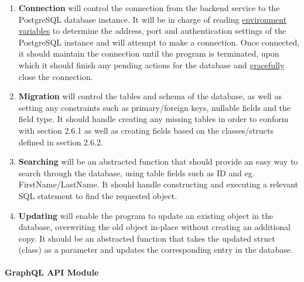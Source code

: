 \documentclass[../../main.tex]{subfiles}
\begin{document}
\begin{enumerate}
    \item \textbf{Connection} will control the connection from the
          backend service to the PostgreSQL database instance. It will be in charge
          of reading \underline{environment variables} to determine
          the address, port and authentication settings of the PostgreSQL
          instance and will attempt to make a connection. Once connected,
          it should maintain the connection until the program is terminated,
          upon which it should finish any pending actions for the database
          and \underline{gracefully} close the connection.

    \item \textbf{Migration} will control the tables and schema of the
          database, as well as setting any constraints such as
          primary/foreign keys, nullable fields and the field type.
          It should handle creating any missing tables in order to conform
          with section 2.6.1 as well as creating fields based on the
          classes/structs defined in section 2.6.2.

    \item \textbf{Searching} will be an abstracted function that should
          provide an easy way to search through the database, using table fields
          such as ID and eg. FirstName/LastName. It should handle constructing
          and executing a relevant SQL statement to find the requested object.

    \item \textbf{Updating} will enable the program to update an existing
          object in the database, overwriting the old object in-place without creating
          an additional copy. It should be an abstracted function that takes the updated
          struct (class) as a parameter and updates the corresponding entry in the database.

\end{enumerate}

\paragraph{GraphQL API Module\\}
\end{document}
